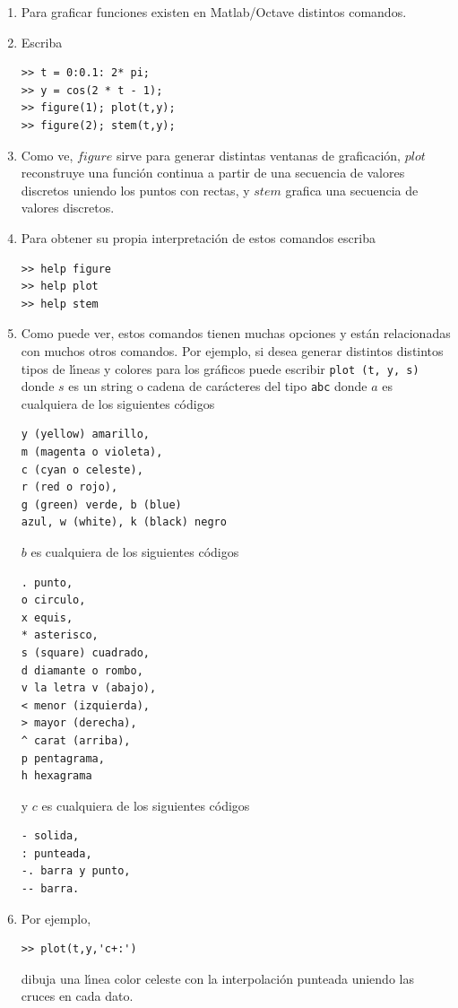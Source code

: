 \begin{enumerate}
\item Para graficar funciones existen en Matlab/Octave distintos comandos. 

\item Escriba
\begin{verbatim}
>> t = 0:0.1: 2* pi;
>> y = cos(2 * t - 1);
>> figure(1); plot(t,y);
>> figure(2); stem(t,y);
\end{verbatim}

\item Como ve, $figure$ sirve para generar distintas ventanas de
graficaci\'{o}n, $%
plot$ reconstruye una funci\'{o}n continua a partir de una secuencia de
valores discretos uniendo los puntos con rectas, y $stem$ grafica una
secuencia de valores discretos.

\item Para obtener su propia interpretaci\'{o}n de estos comandos escriba
\begin{verbatim}
>> help figure
>> help plot
>> help stem
\end{verbatim}

\item Como puede ver, estos comandos tienen muchas opciones y est\'{a}n
relacionadas con muchos otros comandos. Por ejemplo, si desea generar
distintos distintos tipos de l\'{\i}neas y colores para los
gr\'{a}ficos puede escribir \verb-plot (t, y, s)- donde $s$ es un
string o cadena de car\'{a}cteres del tipo \verb-abc- donde $a$ es
cualquiera de los siguientes c\'{o}digos
\begin{verbatim}
y (yellow) amarillo, 
m (magenta o violeta), 
c (cyan o celeste), 
r (red o rojo), 
g (green) verde, b (blue)
azul, w (white), k (black) negro
\end{verbatim}
$b$ es cualquiera de los siguientes c\'{o}digos
\begin{verbatim}
. punto, 
o circulo, 
x equis, 
* asterisco, 
s (square) cuadrado, 
d diamante o rombo, 
v la letra v (abajo), 
< menor (izquierda), 
> mayor (derecha),
^ carat (arriba), 
p pentagrama, 
h hexagrama
\end{verbatim}
y $c$ es cualquiera de los siguientes c\'{o}digos
\begin{verbatim}
- solida, 
: punteada, 
-. barra y punto, 
-- barra.
\end{verbatim}

\item Por ejemplo,
\begin{verbatim}
>> plot(t,y,'c+:')
\end{verbatim}
dibuja una l\'{\i}nea color celeste con la interpolaci\'{o}n punteada
uniendo las cruces en cada dato.


\end{enumerate}
